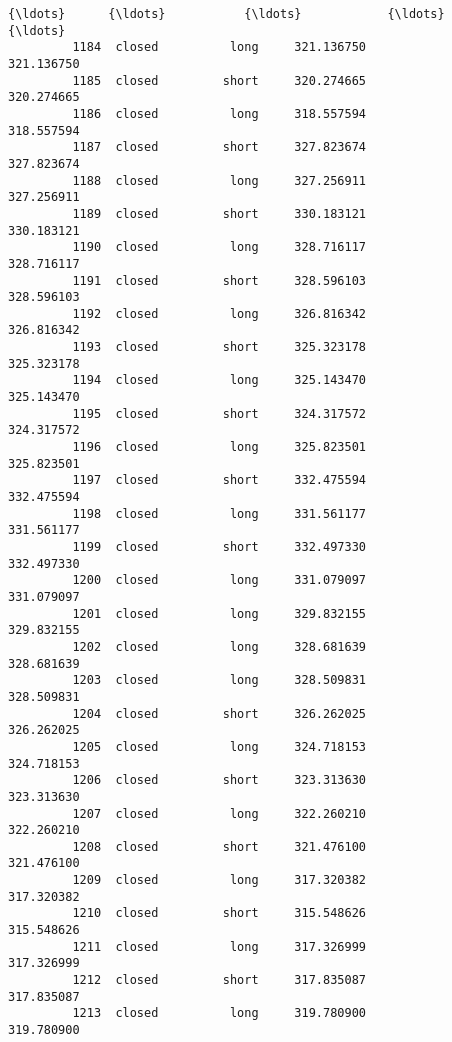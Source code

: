\documentclass[11pt]{article}
\begin{document}
\begin{Verbatim}[commandchars=\\\{\}]
         {\ldots}      {\ldots}           {\ldots}            {\ldots}                      {\ldots}   
         1184  closed          long     321.136750               321.136750   
         1185  closed         short     320.274665               320.274665   
         1186  closed          long     318.557594               318.557594   
         1187  closed         short     327.823674               327.823674   
         1188  closed          long     327.256911               327.256911   
         1189  closed         short     330.183121               330.183121   
         1190  closed          long     328.716117               328.716117   
         1191  closed         short     328.596103               328.596103   
         1192  closed          long     326.816342               326.816342   
         1193  closed         short     325.323178               325.323178   
         1194  closed          long     325.143470               325.143470   
         1195  closed         short     324.317572               324.317572   
         1196  closed          long     325.823501               325.823501   
         1197  closed         short     332.475594               332.475594   
         1198  closed          long     331.561177               331.561177   
         1199  closed         short     332.497330               332.497330   
         1200  closed          long     331.079097               331.079097   
         1201  closed          long     329.832155               329.832155   
         1202  closed          long     328.681639               328.681639   
         1203  closed          long     328.509831               328.509831   
         1204  closed         short     326.262025               326.262025   
         1205  closed          long     324.718153               324.718153   
         1206  closed         short     323.313630               323.313630   
         1207  closed          long     322.260210               322.260210   
         1208  closed         short     321.476100               321.476100   
         1209  closed          long     317.320382               317.320382   
         1210  closed         short     315.548626               315.548626   
         1211  closed          long     317.326999               317.326999   
         1212  closed         short     317.835087               317.835087   
         1213  closed          long     319.780900               319.780900   
         

\end{Verbatim}
\end{document}
